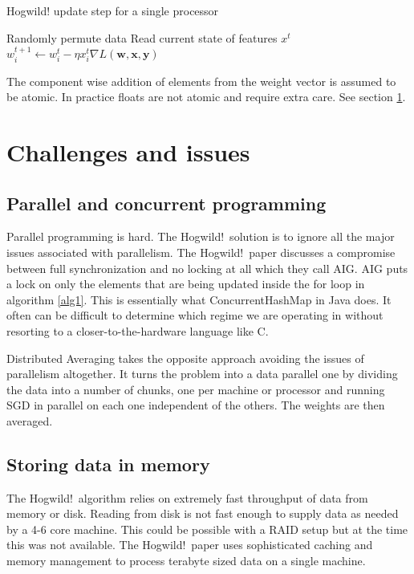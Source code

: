 \documentclass{article} %
\begin{document}
\begin{algorithm}
  \caption{Hogwild! update step for a single processor}

  \begin{algorithmic}
  \Loop
  \State Randomly permute data
  \State Read current state of features $x^t$
  \State $w^{t+1}_i \leftarrow w_i^t - \eta x_i^t \nabla L(\mathbf{w}, \mathbf{x}, \mathbf{y})$
  \EndFor
  \EndLoop
  \end{algorithmic}
  \label{alg1}
\end{algorithm}

The component wise addition of elements from the weight vector is assumed to be atomic. In practice floats are not atomic and require extra care. See section \ref{gen_inst}.

\section{Challenges and issues}
\label{gen_inst}
\subsection{Parallel and concurrent programming}
Parallel programming is hard. The Hogwild!~solution is to ignore all the major issues associated with parallelism. The Hogwild!~paper discusses a compromise between full synchronization and no locking at all which they call AIG. AIG puts a lock on only the elements that are being updated inside the for loop in algorithm \ref{alg1}. This is essentially what ConcurrentHashMap in Java does. It often can be difficult to determine which regime we are operating in without resorting to a closer-to-the-hardware language like C.

Distributed Averaging takes the opposite approach avoiding the issues of parallelism altogether. It turns the problem into a data parallel one by dividing the data into a number of chunks, one per machine or processor and running SGD in parallel on each one independent of the others. The weights are then averaged. 

\subsection{Storing data in memory}
The Hogwild!~algorithm relies on extremely fast throughput of data from memory or disk. Reading from disk is not fast enough to supply data as needed by a 4-6 core machine. This could be possible with a RAID setup but at the time this was not available. The Hogwild!~paper uses sophisticated caching and memory management to process terabyte sized data on a single machine.
\end{document}

